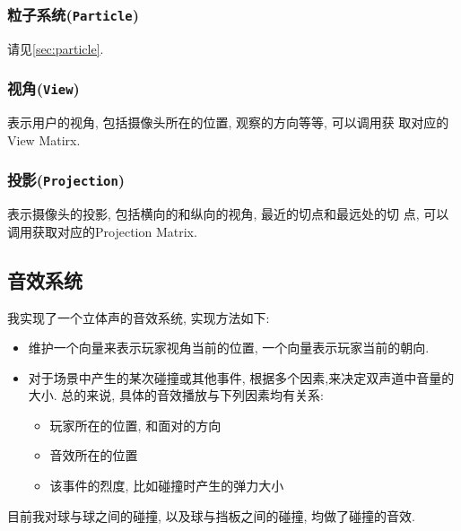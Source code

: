 \documentclass[11pt]{article}
\begin{document}
\subsubsection{粒子系统(\texttt{Particle})}
\label{sec-3-4-5}
请见\ref{sec:particle}.
\subsubsection{视角(\texttt{View})}
\label{sec-3-4-6}
表示用户的视角, 包括摄像头所在的位置, 观察的方向等等, 可以调用获
取对应的View Matirx.

\subsubsection{投影(\texttt{Projection})}
\label{sec-3-4-7}
表示摄像头的投影, 包括横向的和纵向的视角, 最近的切点和最远处的切
点, 可以调用获取对应的Projection Matrix.

\subsection{音效系统}
\label{sec-3-5}
我实现了一个立体声的音效系统, 实现方法如下:
\begin{itemize}
\item 维护一个向量来表示玩家视角当前的位置, 一个向量表示玩家当前的朝向.
\item 对于场景中产生的某次碰撞或其他事件, 根据多个因素,来决定双声道中音量的大小. 总的来说, 具体的音效播放与下列因素均有关系:
\begin{itemize}
\item 玩家所在的位置, 和面对的方向
\item 音效所在的位置
\item 该事件的烈度, 比如碰撞时产生的弹力大小
\end{itemize}
\end{itemize}
目前我对球与球之间的碰撞, 以及球与挡板之间的碰撞, 均做了碰撞的音效.
\end{document}
